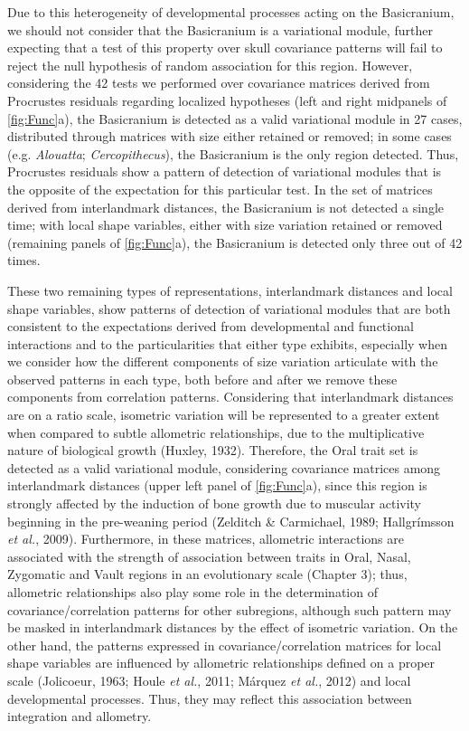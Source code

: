 \documentclass[12pt,twoside]{report}
\begin{document}
Due to this heterogeneity of developmental processes acting on the
Basicranium, we should not consider that the Basicranium is a
variational module, further expecting that a test of this property over
skull covariance patterns will fail to reject the null hypothesis of
random association for this region. However, considering the 42 tests we
performed over covariance matrices derived from Procrustes residuals
regarding localized hypotheses (left and right midpanels of
\autoref{fig:Func}a), the Basicranium is detected as a valid variational
module in 27 cases, distributed through matrices with size either
retained or removed; in some cases (e.g. \emph{Alouatta};
\emph{Cercopithecus}), the Basicranium is the only region detected.
Thus, Procrustes residuals show a pattern of detection of variational
modules that is the opposite of the expectation for this particular
test. In the set of matrices derived from interlandmark distances, the
Basicranium is not detected a single time; with local shape variables,
either with size variation retained or removed (remaining panels of
\autoref{fig:Func}a), the Basicranium is detected only three out of 42
times.

These two remaining types of representations, interlandmark distances
and local shape variables, show patterns of detection of variational
modules that are both consistent to the expectations derived from
developmental and functional interactions and to the particularities
that either type exhibits, especially when we consider how the different
components of size variation articulate with the observed patterns in
each type, both before and after we remove these components from
correlation patterns. Considering that interlandmark distances are on a
ratio scale, isometric variation will be represented to a greater extent
when compared to subtle allometric relationships, due to the
multiplicative nature of biological growth (Huxley, 1932). Therefore,
the Oral trait set is detected as a valid variational module,
considering covariance matrices among interlandmark distances (upper
left panel of \autoref{fig:Func}a), since this region is strongly
affected by the induction of bone growth due to muscular activity
beginning in the pre-weaning period (Zelditch \& Carmichael, 1989;
Hallgrímsson \emph{et al.}, 2009). Furthermore, in these matrices,
allometric interactions are associated with the strength of association
between traits in Oral, Nasal, Zygomatic and Vault regions in an
evolutionary scale (Chapter 3); thus, allometric relationships also play
some role in the determination of covariance/correlation patterns for
other subregions, although such pattern may be masked in interlandmark
distances by the effect of isometric variation. On the other hand, the
patterns expressed in covariance/correlation matrices for local shape
variables are influenced by allometric relationships defined on a proper
scale (Jolicoeur, 1963; Houle \emph{et al.}, 2011; Márquez \emph{et
al.}, 2012) and local developmental processes. Thus, they may reflect
this association between integration and allometry.
\end{document}
